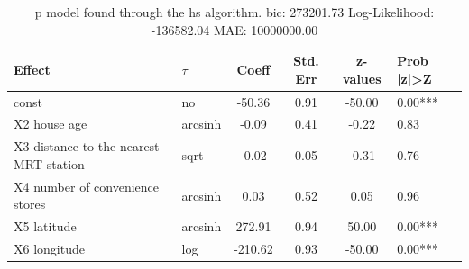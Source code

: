 \begin{table}
	\caption{p model found through the hs algorithm. bic: 273201.73 Log-Likelihood: -136582.04 MAE: 10000000.00}
	\begin{center}
		\begin{tabular}{|l|l|c|c|c|l|}
			\hline
			Effect & $\tau$ & Coeff & Std. Err & z-values & Prob |z|>Z \\
			\hline
			const & no & -50.36 & 0.91 & -50.00 & 0.00*** \\
			\hline
			X2 house age & arcsinh & -0.09 & 0.41 & -0.22 & 0.83 \\
			\hline
			X3 distance to the nearest MRT station & sqrt & -0.02 & 0.05 & -0.31 & 0.76 \\
			\hline
			X4 number of convenience stores & arcsinh & 0.03 & 0.52 & 0.05 & 0.96 \\
			\hline
			X5 latitude & arcsinh & 272.91 & 0.94 & 50.00 & 0.00*** \\
			\hline
			X6 longitude & log & -210.62 & 0.93 & -50.00 & 0.00*** \\
			\hline
		\end{tabular}
	\end{center}
\end{table}
